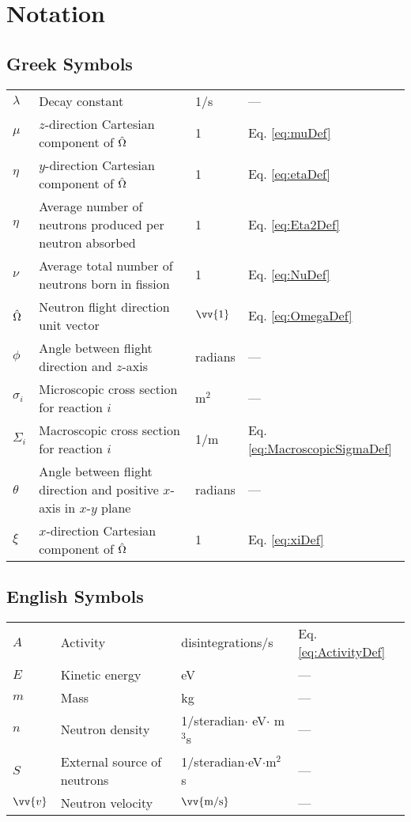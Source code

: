 \section{Notation}

\subsection{Greek Symbols}

\begin{tabular}{l l l l}
\(\lambda\) & Decay constant & 1/s & ---\\
\(\mu\) & \(z\)-direction Cartesian component of \(\hat{\Omega}\) & 1 & Eq. \eqref{eq:muDef}\\
\(\eta\) & \(y\)-direction Cartesian component of \(\hat{\Omega}\) & 1 & Eq. \eqref{eq:etaDef}\\
\(\eta\) & Average number of neutrons produced per neutron absorbed & 1 & Eq. \eqref{eq:Eta2Def}\\
\(\nu\) & Average total number of neutrons born in fission & 1 & Eq. \eqref{eq:NuDef}\\
\(\hat{\Omega}\) & Neutron flight direction unit vector & \(\vv{1}\) & Eq. \eqref{eq:OmegaDef}\\
\(\phi\) & Angle between flight direction and \(z\)-axis & radians & ---\\
\(\sigma_i\) & Microscopic cross section for reaction \(i\) & m$^2$ & ---\\
\(\Sigma_i\) & Macroscopic cross section for reaction \(i\) & 1/m & Eq. \eqref{eq:MacroscopicSigmaDef}\\
\(\theta\) & Angle between flight direction and positive \(x\)-axis in \(x\)-\(y\) plane & radians & ---\\
\(\xi\) & \(x\)-direction Cartesian component of \(\hat{\Omega}\) & 1 & Eq. \eqref{eq:xiDef}\\
\end{tabular}

\subsection{English Symbols}

\begin{tabular}{l l l l}
\(A\) & Activity & disintegrations/s & Eq. \eqref{eq:ActivityDef}\\
\(E\) & Kinetic energy & eV & ---\\
\(m\) & Mass & kg & ---\\
\(n\) & Neutron density & 1/steradian\(\cdot\) eV\(\cdot\) m$^3$s & ---\\
\(S\) & External source of neutrons & 1/steradian\(\cdot\)eV\(\cdot\)m$^2$s & ---\\
\(\vv{v}\) & Neutron velocity & \(\vv{\text{m/s}}\) & ---\\
\end{tabular}

